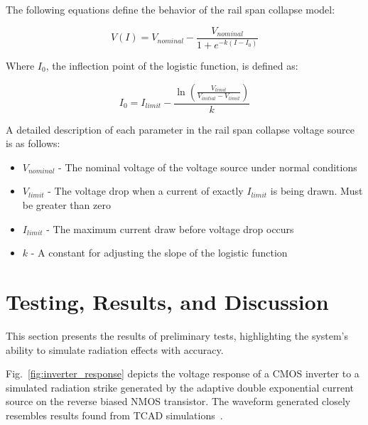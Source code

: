 \documentclass[conference]{IEEEtran}
\begin{document}
    The following equations define the behavior of the rail span collapse model:

    \begin{equation}
        V(I) = V_{nominal} - \frac{V_{nominal}}{1 + e^{-k(I - I_0)}}
        \label{eq:VI}
    \end{equation}

    Where \(I_0\), the inflection point of the logistic function, is defined as:

    \begin{equation}
        I_0 = I_{limit} - \frac{\ln\left(\frac{V_{limit}}{V_{initial} - V_{limit}}\right)}{k}
        \label{eq:I0}
    \end{equation}

    A detailed description of each parameter in the rail span collapse voltage source is as follows:

    \begin{itemize}

        \item[] \(V_{nominal}\) - The nominal voltage of the voltage source under normal conditions

        \item[] \(V_{limit}\) - The voltage drop when a current of exactly \(I_{limit}\) is being drawn.
        Must be greater than zero

        \item[] \(I_{limit}\) - The maximum current draw before voltage drop occurs

        \item[] \(k\) - A constant for adjusting the slope of the logistic function

    \end{itemize}


    \section{Testing, Results, and Discussion}\label{sec:testing-results-and-discussion}
    This section presents the results of preliminary tests, highlighting the system's ability to simulate radiation effects with accuracy.

    Fig.~\ref{fig:inverter_response} depicts the voltage response of a CMOS inverter to a simulated radiation strike generated by the adaptive double exponential current source on the reverse biased NMOS transistor.
    The waveform generated closely resembles results found from TCAD simulations~\cite{Kauppila2009}.
\end{document}
